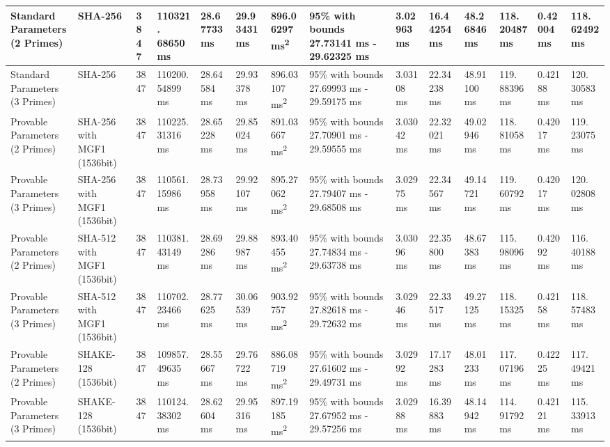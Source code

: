 \documentclass[]{final_report}
\theoremstyle{definition}
\begin{document}
\begin{landscape}
\begin{longtable}{|p{2.3cm}|p{1.8cm}|p{1.0cm}|p{1.7cm}|p{1.4cm}|p{1.5cm}|p{1.8cm}|p{1.5cm}|p{1.2cm}|p{1.5cm}|p{1.3cm}|p{1.2cm}|p{1.3cm}|p{1.3cm}|}
\hline
\endlastfoot
Standard Parameters (2 Primes) & SHA-256 & 3847 & 110321.
68650 ms & 28.67733 ms & 29.93431 ms & 896.06297 ms\textsuperscript{2}  & 95\% with bounds 27.73141 ms - 29.62325 ms & 3.02963 ms & 16.44254 ms & 48.26846 ms & 118.
20487 ms & 0.42004 ms & 118.
62492 ms \\
\hline
Standard Parameters (3 Primes) & SHA-256 & 3847 & 110200.
54899 ms & 28.64584 ms & 29.93378 ms & 896.03107 ms\textsuperscript{2}  & 95\% with bounds 27.69993 ms - 29.59175 ms & 3.03108 ms & 22.34238 ms & 48.91100 ms & 119.
88396 ms & 0.42188 ms & 120.
30583 ms \\
\hline
Provable Parameters (2 Primes) & SHA-256 with MGF1 (1536bit) & 3847 & 110225.
31316 ms & 28.65228 ms & 29.85024 ms & 891.03667 ms\textsuperscript{2} & 95\% with bounds 27.70901 ms - 29.59555 ms & 3.03042 ms & 22.32021 ms & 49.02946 ms & 118.
81058 ms & 0.42017 ms & 119.
23075 ms \\
\hline
Provable Parameters (3 Primes) & SHA-256 with MGF1 (1536bit) & 3847 & 110561.
15986 ms & 28.73958 ms & 29.92107 ms & 895.27062 ms\textsuperscript{2}  & 95\% with bounds 27.79407 ms - 29.68508 ms & 3.02975 ms & 22.34567 ms & 49.14721 ms & 119.
60792 ms & 0.42017 ms & 120.
02808 ms \\
\hline
Provable Parameters (2 Primes) & SHA-512 with MGF1 (1536bit) & 3847 & 110381.
43149 ms & 28.69286 ms & 29.88987 ms & 893.40455 ms\textsuperscript{2}  & 95\% with bounds 27.74834 ms - 29.63738 ms & 3.03096 ms & 22.35800 ms & 48.67383 ms & 115.
98096 ms & 0.42092 ms & 116.
40188 ms \\
\hline
Provable Parameters (3 Primes) & SHA-512 with MGF1 (1536bit) & 3847 & 110702.
23466 ms & 28.77625 ms & 30.06539 ms & 903.92757 ms\textsuperscript{2}  & 95\% with bounds 27.82618 ms - 29.72632 ms & 3.02946 ms & 22.33517 ms & 49.27125 ms & 118.
15325 ms & 0.42158 ms & 118.
57483 ms \\
\hline
Provable Parameters (2 Primes) & SHAKE-128 (1536bit) & 3847 & 109857.
49635 ms & 28.55667 ms & 29.76722 ms & 886.08719 ms\textsuperscript{2}  & 95\% with bounds 27.61602 ms - 29.49731 ms & 3.02992 ms & 17.17283 ms & 48.01233 ms & 117.
07196 ms & 0.42225 ms & 117.
49421 ms \\
\hline
Provable Parameters (3 Primes) & SHAKE-128 (1536bit) & 3847 & 110124.
38302 ms & 28.62604 ms & 29.95316 ms & 897.19185 ms\textsuperscript{2}  & 95\% with bounds 27.67952 ms - 29.57256 ms & 3.02988 ms & 16.39883 ms & 48.14942 ms & 114.
91792 ms & 0.42121 ms & 115.
33913 ms \\

\end{longtable}
\end{landscape}
\end{document}
